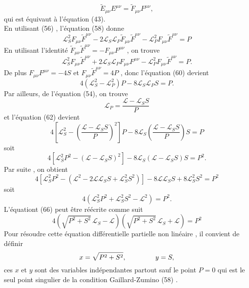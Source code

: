 \documentclass[12pt,a4paper, openany]{article}
\begin{document}
\begin{equation}
	\tilde{E}_{\mu \nu}E^{\mu \nu}=\tilde{F}_{\mu \nu}F^{\mu \nu} ,
\end{equation}
qui est équivaut à l'équation (43).\\
En utilisant (56) , l'équation (58) donne 
\begin{equation}
	\mathcal{L}^2_S F_{\mu \nu}\tilde{F}^{\mu \nu}-2\mathcal{L}_S \mathcal{L}_P \tilde{F}_{\mu \nu}\tilde{F}^{\mu \nu}-\mathcal{L}^2_P F_{\mu \nu}\tilde{F}^{\mu \nu}=P
\end{equation}
En utilisant l'identité $\tilde{F}_{\mu \nu}\tilde{F}^{\mu \nu}=-F_{\mu \nu}F^{\mu \nu}$ , on trouve 
\begin{equation}
\mathcal{L}^2_S F_{\mu \nu}\tilde{F}^{\mu \nu}+2\mathcal{L}_S \mathcal{L}_P F_{\mu \nu}F^{\mu \nu} -\mathcal{L}^2_P F_{\mu \nu}\tilde{F}^{\mu \nu}=P.
\end{equation}
De plus $F_{\mu \nu}F^{\mu \nu}=-4S$  et $F_{\mu \nu}\tilde{F}^{\mu \nu}=4P$ , donc l'équation (60) devient 
\begin{equation}
	4\left(\mathcal{L}^2_S-\mathcal{L}^2_P\right)P-8\mathcal{L}_S \mathcal{L}_P S=P.
\end{equation}
Par ailleurs, de l'équation (54), on trouve 
\begin{equation}
\mathcal{L}_P=\frac{\mathcal{L}-\mathcal{L}_S S}{P}	
\end{equation}
et l'équation (62) devient 
\begin{equation}
	4\left[\mathcal{L}^2_S-\left(\frac{\mathcal{L}-\mathcal{L}_S S}{P}\right)^2 \right]P-8\mathcal{L}_S\left(\frac{\mathcal{L}-\mathcal{L}_S S}{P}\right)S=P
\end{equation} 
soit
\begin{equation}
	4\left[\mathcal{L}^2_S P^2-\left(\mathcal{L}-\mathcal{L}_S S\right)^2 \right]-8\mathcal{L}_S\left(\mathcal{L}-\mathcal{L}_S S \right)S=P^2.
\end{equation}
Par suite , on obtient 
\begin{equation}
	4\left[\mathcal{L}^2_S P^2-\left(\mathcal{L}^2-2\mathcal{L}\mathcal{L}_S S+\mathcal{L}^2_S S^2\right) \right]-8\mathcal{L}\mathcal{L}_S S+8\mathcal{L}^2_S S^2=P^2
\end{equation}
soit 
\begin{equation}
4\left(\mathcal{L}^2_S P^2+\mathcal{L}^2_S S^2-\mathcal{L}^2\right)=P^2	.
\end{equation}
L'équationt (66) peut \^{e}tre réécrite comme suit 
\begin{equation}
4\left(\sqrt{P^2+ S^2}\,\mathcal{L}_S-\mathcal{L}\right)\left(\sqrt{P^2+ S^2}\,\mathcal{L}_S+\mathcal{L}\right)=P^2
\end{equation}
Pour résoudre cette équation différentielle partielle non linéaire , il convient de définir 
\begin{equation}
	x=\sqrt{P^2+ S^2} , \hspace{1.5cm} y=S ,
\end{equation}
ces $x$ et $y$ sont des variables indépendantes partout sauf le point $P=0$ qui est le seul point singulier de la condition Gaillard-Zumino (58) .
\end{document}
